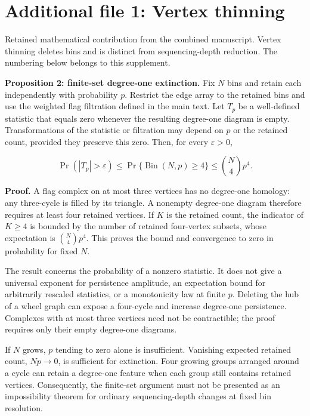 \documentclass[
  11pt,
]{article}
\author{}
\date{}
\begin{document}
\section{Additional file 1: Vertex
thinning}\label{additional-file-1-vertex-thinning}

Retained mathematical contribution from the combined manuscript. Vertex
thinning deletes bins and is distinct from sequencing-depth reduction.
The numbering below belongs to this supplement.

\textbf{Proposition 2: finite-set degree-one extinction.} Fix \(N\) bins
and retain each independently with probability \(p\). Restrict the edge
array to the retained bins and use the weighted flag filtration defined
in the main text. Let \(T_p\) be a well-defined statistic that equals
zero whenever the resulting degree-one diagram is empty. Transformations
of the statistic or filtration may depend on \(p\) or the retained
count, provided they preserve this zero. Then, for every
\(\varepsilon > 0\),

\[\Pr(|T_p|>\varepsilon)\leq\Pr\{\operatorname{Bin}(N,p)\geq4\}\leq \binom{N}{4}p^4.\]

\textbf{Proof.} A flag complex on at most three vertices has no
degree-one homology: any three-cycle is filled by its triangle. A
nonempty degree-one diagram therefore requires at least four retained
vertices. If \(K\) is the retained count, the indicator of \(K \geq  4\)
is bounded by the number of retained four-vertex subsets, whose
expectation is \(\binom{N}{4}p^4\). This proves the bound and
convergence to zero in probability for fixed \(N\).

The result concerns the probability of a nonzero statistic. It does not
give a universal exponent for persistence amplitude, an expectation
bound for arbitrarily rescaled statistics, or a monotonicity law at
finite \(p\). Deleting the hub of a wheel graph can expose a four-cycle
and increase degree-one persistence. Complexes with at most three
vertices need not be contractible; the proof requires only their empty
degree-one diagrams.

If \(N\) grows, \(p\) tending to zero alone is insufficient. Vanishing
expected retained count, \(Np \to  0\), is sufficient for extinction.
Four growing groups arranged around a cycle can retain a degree-one
feature when each group still contains retained vertices. Consequently,
the finite-set argument must not be presented as an impossibility
theorem for ordinary sequencing-depth changes at fixed bin resolution.
\end{document}
